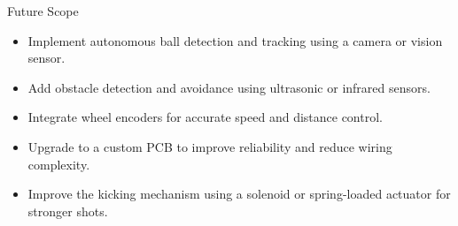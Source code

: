\documentclass[aspectratio=169]{beamer}
\begin{document}
\begin{frame}{Future Scope}
  \begin{itemize}
    \item Implement autonomous ball detection and tracking using a camera or vision sensor.
    \item Add obstacle detection and avoidance using ultrasonic or infrared sensors.
    \item Integrate wheel encoders for accurate speed and distance control.
    \item Upgrade to a custom PCB to improve reliability and reduce wiring complexity.
    \item Improve the kicking mechanism using a solenoid or spring-loaded actuator for stronger shots.
  \end{itemize}
\end{frame}

\begin{frame}[plain]
\end{frame}
\end{document}

